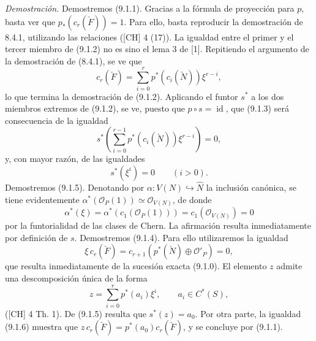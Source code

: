\emph{Demostración.} Demostremos (9.1.1). Gracias a la fórmula de proyección para $p$, basta ver que $p_*(c_r(\check F))=1$. Para ello, basta reproducir la demostración de 8.4.1, utilizando las relaciones ([CH] 4 (17)). La igualdad entre el primer y el tercer miembro de (9.1.2) no es sino el lema 3 de [1]. Repitiendo el argumento de la demostración de (8.4.1), se ve que
\[
c_r(\check F)=\sum_{i=0}^r p^*(c_i(\check N))\xi^{r-i},
\tag{9.1.2 bis}
\]
lo que termina la demostración de (9.1.2). Aplicando el funtor $s^*$ a los dos miembros extremos de (9.1.2), se ve, puesto que $p\circ s=\operatorname{id}$, que (9.1.3) será consecuencia de la igualdad
\[
s^*\left(\sum_{i=0}^{r-1}p^*(c_i(\check N))\xi^{r-i}\right)=0,
\]
y, con mayor razón, de las igualdades
\[
s^*(\xi^i)=0\qquad(i>0).
\tag{9.1.5}
\]
Demostremos (9.1.5). Denotando por $\alpha:V(N)\hookrightarrow\widehat N$ la inclusión canónica, se tiene evidentemente $\alpha^*(\mathcal O_P(1))\simeq\mathcal O_{V(N)}$, de donde
\[
\alpha^*(\xi)=\alpha^*(c_1(\mathcal O_P(1)))=c_1(\mathcal O_{V(N)})=0
\]
por la funtorialidad de las clases de Chern. La afirmación resulta inmediatamente por definición de $s$. Demostremos (9.1.4). Para ello utilizaremos la igualdad
\[
\xi\,c_r(\check F)=c_{r+1}(p^*(\check N)\oplus\mathcal O'_P)=0,
\tag{9.1.6}
\]
que resulta inmediatamente de la sucesión exacta (9.1.0). El elemento $z$ admite una descomposición única de la forma
\[
z=\sum_{i=0}^r p^*(a_i)\xi^i,\qquad a_i\in C^*(S),
\]
([CH] 4 Th. 1). De (9.1.5) resulta que $s^*(z)=a_0$. Por otra parte, la igualdad (9.1.6) muestra que $z\,c_r(\check F)=p^*(a_0)c_r(\check F)$, y se concluye por (9.1.1).
